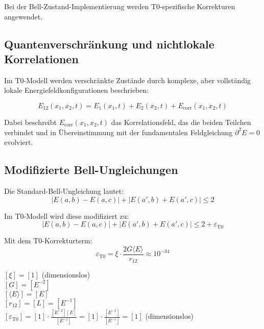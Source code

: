\documentclass[12pt,a4paper]{article}
\newcommand{\epst}{\varepsilon_{\text{T0}}}
\theoremstyle{definition}
\begin{document}
	Bei der Bell-Zustand-Implementierung werden T0-spezifische Korrekturen angewendet.
	

	\subsection{Quantenverschränkung und nichtlokale Korrelationen}
	
	Im T0-Modell werden verschränkte Zustände durch komplexe, aber vollständig lokale Energiefeldkonfigurationen beschrieben:
	
	\begin{equation}
		E_{12}(x_1,x_2,t) = E_1(x_1,t) + E_2(x_2,t) + E_{\text{corr}}(x_1,x_2,t)
	\end{equation}
	
	Dabei beschreibt $E_{\text{corr}}(x_1,x_2,t)$ das Korrelationsfeld, das die beiden Teilchen verbindet und in Übereinstimmung mit der fundamentalen Feldgleichung $\partial^2 E = 0$ evolviert.
	
	\subsection{Modifizierte Bell-Ungleichungen}
	
	Die Standard-Bell-Ungleichung lautet:
	\begin{equation}
		|E(a,b) - E(a,c)| + |E(a',b) + E(a',c)| \leq 2
	\end{equation}
	
	Im T0-Modell wird diese modifiziert zu:
	\begin{equation}
		\boxed{|E(a,b) - E(a,c)| + |E(a',b) + E(a',c)| \leq 2 + \epst}
	\end{equation}
	
	Mit dem T0-Korrekturterm:
	\begin{equation}
		\epst = \xi \cdot \frac{2G\langle E \rangle}{r_{12}} \approx 10^{-34}
	\end{equation}
	
	\begin{einheitencheck}
		$[\xi] = [1]$ (dimensionslos)\\
		$[G] = [E^{-2}]$\\
		$[\langle E \rangle] = [E]$\\
		$[r_{12}] = [L] = [E^{-1}]$\\
		$[\epst] = [1] \cdot \frac{[E^{-2}][E]}{[E^{-1}]} = [1] \cdot \frac{[E^{-1}]}{[E^{-1}]} = [1]$ (dimensionslos) \checkmark
	\end{einheitencheck}
	
\end{document}
